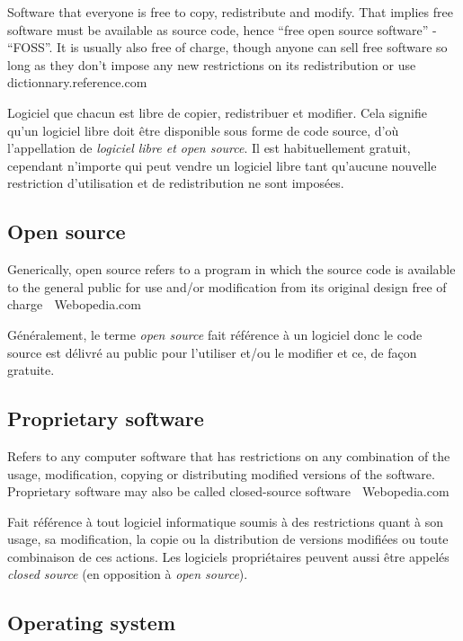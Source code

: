 \documentclass[12pt]{article}
\begin{document}
{\color{bg}Software that everyone is free to copy, redistribute and
  modify. That implies free software must be available as source code,
  hence ``free open source software'' - ``FOSS''. It is usually also free
  of charge, though anyone can sell free software so long as they
  don't impose any new restrictions on its redistribution or use
  \textemdash $\;$ dictionnary.reference.com }

Logiciel que chacun est libre de copier, redistribuer et
modifier. Cela signifie qu'un logiciel libre doit être disponible sous
forme de code source, d'o\`u l'appellation de \textit{logiciel libre
  et open source}. Il est habituellement gratuit, cependant n'importe
qui peut vendre un logiciel libre tant qu'aucune nouvelle
restriction d'utilisation et de redistribution ne sont imposées.

\subsection*{Open source}

{\color{bg}Generically, open source refers to a program in which the
  source code is available to the general public for use and/or
  modification from its original design free of charge \textemdash
  $\;$ Webopedia.com }

Généralement, le terme \textit{open source} fait référence à un
logiciel donc le code source est délivré au public pour l'utiliser
et/ou le modifier et ce, de façon gratuite.

\subsection*{Proprietary software}

{\color{bg}Refers to any computer software that has restrictions on
  any combination of the usage, modification, copying or distributing
  modified versions of the software. Proprietary software may also be
  called closed-source software \textemdash $\;$ Webopedia.com }

Fait référence à tout logiciel informatique soumis à des restrictions
quant à son usage, sa modification, la copie ou la distribution de
versions modifiées ou toute combinaison de ces actions. Les logiciels
propriétaires peuvent aussi être appelés \textit{closed source} (en
opposition à \textit{open source}).

\subsection*{Operating system}
\end{document}
